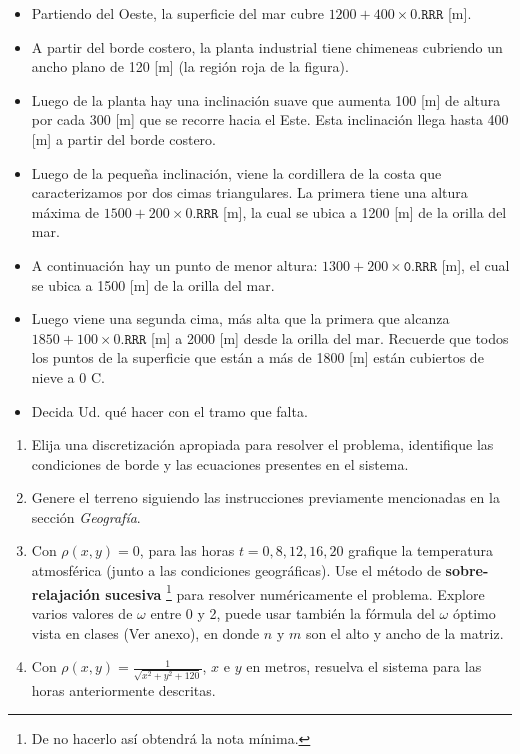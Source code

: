 \documentclass[letterpaper,11pt]{article} %
\begin{document}
\begin{itemize}[label={--}]
	\item Partiendo del Oeste, la superficie del mar cubre $1200 + 400 \times
	0.\texttt{RRR}$ [m].
	\item A partir del borde costero, la planta industrial tiene chimeneas
	cubriendo un ancho plano de 120 [m] (la región roja de la figura).
	\item Luego de la planta hay una inclinación suave que aumenta 100 [m] de
	altura por cada 300 [m] que se recorre hacia el Este. Esta inclinación llega
	hasta 400 [m] a partir del borde costero.
	\item Luego de la pequeña inclinación, viene la cordillera de la costa
	que caracterizamos por dos cimas triangulares. La primera tiene una altura
	máxima de $1500 + 200 \times 0.\texttt{RRR}$ [m], la cual se ubica a 1200 [m]
	de la orilla del mar.
	\item A continuación hay un punto de menor altura: $1300 + 200
	\times\texttt{0.RRR}$ [m], el cual se ubica a 1500 [m] de la orilla del mar.
	\item Luego viene una segunda cima, más alta que la primera que alcanza
	$1850 + 100 \times 0.\texttt{RRR}$ [m] a 2000 [m] desde la orilla del mar.
	Recuerde que todos los puntos de la superficie que están a más de 1800 [m]
	están cubiertos de nieve a 0 \textordmasculine C.
	\item Decida Ud. qué hacer con el tramo que falta.
\end{itemize}


\begin{enumerate}
	\item Elija una discretización apropiada para resolver el problema, identifique las condiciones de borde y las ecuaciones presentes en el sistema.
	\item Genere el terreno siguiendo las instrucciones previamente mencionadas en la sección \textit{Geografía}.
	\item Con $\rho(x,y)=0$, para las horas ${t=0, 8, 12, 16, 20}$ grafique la temperatura atmosférica (junto a las condiciones geográficas). Use el método de \textbf{sobre-relajación sucesiva} \footnote{De no hacerlo así obtendrá la nota mínima.} para resolver numéricamente el problema. Explore varios valores de $\omega$ entre 0 y 2, puede usar también la fórmula del $\omega$ óptimo vista en clases (Ver anexo), en donde $n$ y $m$ son el alto y ancho de la matriz.
	\item Con $\rho(x,y)=\frac{1}{\sqrt{x^2+y^2+120}}$, $x$ e $y$ en metros, resuelva el sistema para las horas anteriormente descritas.
\end{enumerate}
\end{document}
